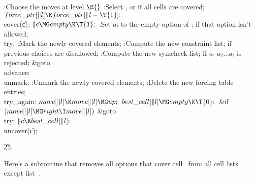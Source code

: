 \Y\B\4:Choose the moves at level \X${}\E{}$\6
:Select , or  if
all cells are covered\X;\6
${}\\{force\_ptr}[\|l]\K\\{force\_ptr}[\|l-\T{1}];{}$\6
\\{cover}(\|c);\6
${}\|c\MG\\{empty}\K\T{1};{}$\6
:Set $a_l$ to the empty option of ;  if
that option isn't allowed\X;\6
\4\\{try}:\5
:Mark the newly covered elements\X;\6
:Compute the new constraint list;  if previous
choices are disallowed\X;\6
:Compute the new symcheck list;  if $a_1\,a_2\ldots
a_l$ is rejected\X;\6
\&{goto} \\{advance};\6
\4\\{unmark}:\5
:Unmark the newly covered elements\X;\6
:Delete the new forcing table entries\X;\6
\4\\{try\_again}:\5
${}\\{move}[\|l]\K\\{move}[\|l]\MG\\{up};{}$\6
${}\\{best\_cell}[\|l]\MG\\{empty}\K\T{0};{}$\6
\&{if} ${}(\\{move}[\|l]\MG\\{right}\I\\{move}[\|l]){}$\1\5
\&{goto} \\{try};\2\6
${}\|c\K\\{best\_cell}[\|l];{}$\6
\\{uncover}(\|c);\par
\U25.\fi

Here's a subroutine that removes all options that cover
cell~ from all
cell lists except list~.

